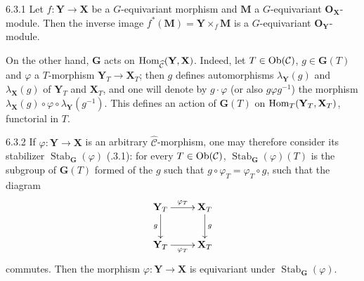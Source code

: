 \begin{lemma}{6.3.1}\label{I.6.3.1}
Let \(f\colon\mathbf{Y}\to\mathbf{X}\) be a \(G\)-equivariant morphism and \(\mathbf{M}\) a
\(G\)-equivariant \(\mathbf{O}_{\mathbf{X}}\)-module. Then the inverse image
\(f^{*}(\mathbf{M})=\mathbf{Y}\times_{f}\mathbf{M}\) is a \(G\)-equivariant
\(\mathbf{O}_{\mathbf{Y}}\)-module.
\end{lemma}

On the other hand, \(\mathbf{G}\) acts on
\(\operatorname{Hom}_{\widehat{\mathcal{C}}}(\mathbf{Y},\mathbf{X})\). Indeed, let
\(T\in\operatorname{Ob}(\mathcal{C})\), \(g\in\mathbf{G}(T)\) and \(\varphi\) a \(T\)-morphism
\(\mathbf{Y}_{T}\to\mathbf{X}_{T}\); then \(g\) defines automorphisms
\(\lambda_{\mathbf{Y}}(g)\) and \(\lambda_{\mathbf{X}}(g)\) of \(\mathbf{Y}_{T}\) and
\(\mathbf{X}_{T}\), and one will denote by \(g\cdot\varphi\) (or also
\(g\varphi g^{-1}\)) the morphism
\(\lambda_{\mathbf{X}}(g)\circ\varphi\circ\lambda_{\mathbf{Y}}(g^{-1})\).
This defines an action of \(\mathbf{G}(T)\) on
\(\operatorname{Hom}_{T}(\mathbf{Y}_{T},\mathbf{X}_{T})\), functorial in \(T\).

\begin{definition}{6.3.2}\label{I.6.3.2}
If \(\varphi\colon\mathbf{Y}\to\mathbf{X}\) is an arbitrary
\(\widehat{\mathcal{C}}\)-morphism, one may therefore consider its stabilizer
\(\operatorname{Stab}_{\mathbf{G}}(\varphi)\) (.3.1): for every
\(T\in\operatorname{Ob}(\mathcal{C})\), \(\operatorname{Stab}_{\mathbf{G}}(\varphi)(T)\) is the
subgroup of \(\mathbf{G}(T)\) formed of the \(g\) such that
\(g\circ\varphi_{T}=\varphi_{T}\circ g\), \ie such that the diagram
\[
\xymatrix{
\mathbf{Y}_{T} \ar[r]^{\varphi_{T}} \ar[d]_{g}
  & \mathbf{X}_{T} \ar[d]^{g} \\
\mathbf{Y}_{T} \ar[r]_{\varphi_{T}}
  & \mathbf{X}_{T}
}
\]
commutes. Then the morphism \(\varphi\colon\mathbf{Y}\to\mathbf{X}\) is
equivariant under \(\operatorname{Stab}_{\mathbf{G}}(\varphi)\).
\end{definition}

